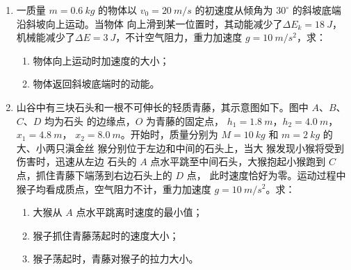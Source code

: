 \begin{enumerate}
{}


\newpage
\item 
{}
一质量 $ m=0.6 \ kg $ 的物体以 $ v_{0} =20 \ m/s $ 的初速度从倾角为 $ 30 ^{\circ} $ 的斜坡底端沿斜坡向上运动。当物体
向上滑到某一位置时，其动能减少了$ \Delta E_{k} =18 \ J $，机械能减少了$ \Delta E=3 \ J $，不计空气阻力，重力加速度
$ g=10 \ m/s^{2} $，求：
\begin{enumerate}
\renewcommand{\labelenumi}{\arabic{enumi}.}
\item
物体向上运动时加速度的大小；
\item 
物体返回斜坡底端时的动能。




\end{enumerate}



\newpage
\item 
{}
山谷中有三块石头和一根不可伸长的轻质青藤，其示意图如下。图中 $ A $、$ B $、$ C $、$ D $ 均为石头
的边缘点，$ O $ 为青藤的固定点，
$ h_{1} =1.8 \ m $，$ h_{2} =4.0 \ m $，$ x_{1} =4.8 \ m $，
$ x_{2} =8.0 \ m $。开始时，质量分别为
$ M=10 \ kg $ 和 $ m=2 \ kg $ 的大、小两只滇金丝
猴分别位于左边和中间的石头上，当大
猴发现小猴将受到伤害时，迅速从左边
石头的 $ A $ 点水平跳至中间石头，大猴抱起小猴跑到 $ C $ 点，抓住青藤下端荡到右边石头上的 $ D $ 点，
此时速度恰好为零。运动过程中猴子均看成质点，空气阻力不计，重力加速度 $ g=10 \ m/s^{2} $。求：
\begin{enumerate}
\renewcommand{\labelenumi}{\arabic{enumi}.}
\item
大猴从 $ A $ 点水平跳离时速度的最小值；
\item 
猴子抓住青藤荡起时的速度大小；
\item 
猴子荡起时，青藤对猴子的拉力大小。




\end{enumerate}
\end{enumerate}
